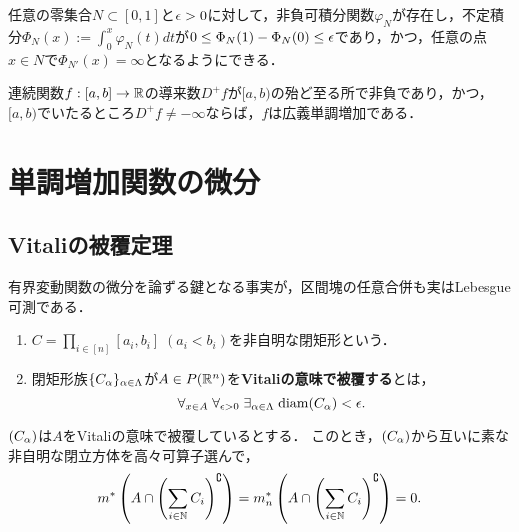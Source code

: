 \documentclass[uplatex, dvipdfmx]{jsreport}
\begin{document}
\begin{theorem}
    任意の零集合$N\subset[0,1]$と$\epsilon>0$に対して，非負可積分関数$\varphi_N$が存在し，不定積分$\Phi_N(x):=\int^x_0\varphi_N(t)dt$が$0\le\Phi_N(1)-\Phi_N(0)\le\epsilon$であり，かつ，任意の点$x\in N$で$\Phi_{N'}(x)=\infty$となるようにできる．
\end{theorem}

\begin{corollary}[一般化されたDiniの定理]
    連続関数$f:[a,b]\to\mathbb{R}$の導来数$D^+f$が$[a,b)$の殆ど至る所で非負であり，かつ，
    $[a,b)$でいたるところ$D^+f\ne-\infty$ならば，$f$は広義単調増加である．
\end{corollary}

\section{単調増加関数の微分}

\subsection{Vitaliの被覆定理}

\begin{tcolorbox}[colframe=ForestGreen, colback=ForestGreen!10!white,breakable,colbacktitle=ForestGreen!40!white,coltitle=black,fonttitle=\bfseries\sffamily,
title=]
    有界変動関数の微分を論ずる鍵となる事実が，区間塊の任意合併も実はLebesgue可測である．
\end{tcolorbox}

\begin{definition}\mbox{}
    \begin{enumerate}
        \item $C=\prod_{i\in[n]}[a_i,b_i]\;(a_i<b_i)$を非自明な閉矩形という．
        \item 閉矩形族$\{C_\alpha\}_{\alpha\in\Lambda}$が$A\in P(\mathbb{R}^n)$を\textbf{Vitaliの意味で被覆する}とは，
        \[\forall_{x\in A}\;\forall_{\epsilon>0}\;\exists_{\alpha\in\Lambda}\;\mathrm{diam}(C_\alpha)<\epsilon.\]
    \end{enumerate}
\end{definition}



\begin{theorem}[Vitali (1907)]
    $(C_\alpha)$は$A$をVitaliの意味で被覆しているとする．
    このとき，$(C_\alpha)$から互いに素な非自明な閉立方体を高々可算子選んで，
    \[m^*\left(A\cap\left(\sum_{i\in\mathbb{N}}C_i\right)^\complement\right)=m_n^*\left(A\cap\left(\sum_{i\in\mathbb{N}}C_i\right)^\complement\right)=0.\]
\end{theorem}
\end{document}
